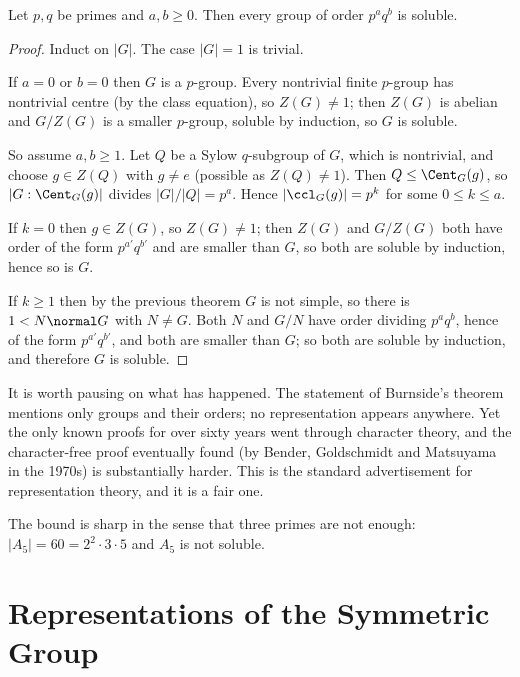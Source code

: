 \begin{theorem}[Burnside, 1904]
	Let $p, q$ be primes and $a, b\geq0$. Then every group of order $p^aq^b$ is soluble.
\end{theorem}
\begin{proof}
	Induct on $|G|$. The case $|G| = 1$ is trivial.

	If $a = 0$ or $b = 0$ then $G$ is a $p$-group. Every nontrivial finite $p$-group has nontrivial centre (by the class equation), so $Z(G)\neq1$; then $Z(G)$ is abelian and $G/Z(G)$ is a smaller $p$-group, soluble by induction, so $G$ is soluble.

	So assume $a, b\geq 1$. Let $Q$ be a Sylow $q$-subgroup of $G$, which is nontrivial, and choose $g\in Z(Q)$ with $g\neq e$ (possible as $Z(Q)\neq1$). Then $Q\leq\Cent_G(g)$, so $|G:\Cent_G(g)|$ divides $|G|/|Q| = p^a$. Hence $|\ccl_G(g)| = p^k$ for some $0\leq k\leq a$.

	If $k = 0$ then $g\in Z(G)$, so $Z(G)\neq1$; then $Z(G)$ and $G/Z(G)$ both have order of the form $p^{a'}q^{b'}$ and are smaller than $G$, so both are soluble by induction, hence so is $G$.

	If $k\geq1$ then by the previous theorem $G$ is not simple, so there is $1 < N\normal G$ with $N\neq G$. Both $N$ and $G/N$ have order dividing $p^aq^b$, hence of the form $p^{a'}q^{b'}$, and both are smaller than $G$; so both are soluble by induction, and therefore $G$ is soluble.
\end{proof}

\begin{remark}
	It is worth pausing on what has happened. The statement of Burnside's theorem mentions only groups and their orders; no representation appears anywhere. Yet the only known proofs for over sixty years went through character theory, and the character-free proof eventually found (by Bender, Goldschmidt and Matsuyama in the 1970s) is substantially harder. This is the standard advertisement for representation theory, and it is a fair one.
\end{remark}

\begin{remark}
	The bound is sharp in the sense that three primes are not enough: $|A_5| = 60 = 2^2\cdot3\cdot5$ and $A_5$ is not soluble.
\end{remark}

\section{Representations of the Symmetric Group}

